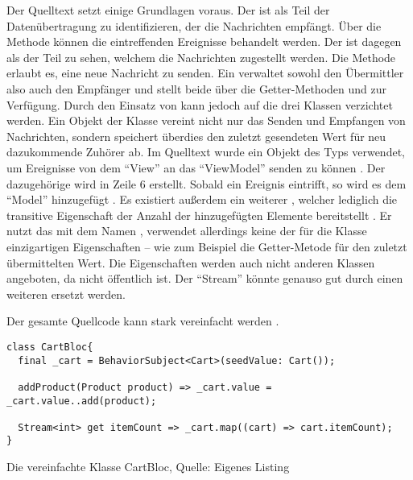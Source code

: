 Der Quelltext setzt einige Grundlagen voraus.
Der  ist als Teil der Datenübertragung zu identifizieren,
der die Nachrichten empfängt.
Über die Methode  können die eintreffenden Ereignisse behandelt werden.
Der  ist dagegen als der Teil zu sehen,
welchem die Nachrichten zugestellt werden.
Die Methode  erlaubt es,
eine neue Nachricht zu senden.
Ein  verwaltet sowohl den Übermittler also auch den Empfänger
und stellt beide über die Getter-Methoden  und  zur Verfügung.
Durch den Einsatz von  kann jedoch auf die drei Klassen verzichtet werden.
Ein Objekt der Klasse  vereint nicht nur das Senden und Empfangen von Nachrichten,
sondern speichert überdies den zuletzt gesendeten Wert für neu dazukommende Zuhörer ab.
Im Quelltext wurde ein Objekt des Typs  verwendet,
um Ereignisse von dem \enquote{View} an das \enquote{ViewModel} senden zu können .
Der dazugehörige  wird in Zeile 6 erstellt.
Sobald ein Ereignis eintrifft,
so wird es dem \enquote{Model}  hinzugefügt .
Es existiert außerdem ein weiterer  ,
 welcher lediglich die transitive Eigenschaft der Anzahl der hinzugefügten Elemente bereitstellt .
Er nutzt das  mit dem Namen  ,
verwendet allerdings keine der für die Klasse einzigartigen Eigenschaften
-- wie zum Beispiel die Getter-Metode  für den zuletzt übermittelten Wert.
Die Eigenschaften werden auch nicht anderen Klassen angeboten, da  nicht öffentlich ist.
Der \enquote{Stream}  könnte genauso gut durch einen weiteren  ersetzt werden.

Der gesamte Quellcode kann stark vereinfacht werden \Lst{\ref{lst:CartBlocVereinfacht}}.
\ifIncludeFigures
  \begin{listing}[h]
    \begin{verbatim}
class CartBloc{
  final _cart = BehaviorSubject<Cart>(seedValue: Cart());

  addProduct(Product product) => _cart.value = _cart.value..add(product);

  Stream<int> get itemCount => _cart.map((cart) => cart.itemCount);
}
\end{verbatim}
    \caption[Die vereinfachte Klasse CartBloc]{Die vereinfachte Klasse CartBloc, Quelle: Eigenes Listing}
    \label{lst:CartBlocVereinfacht}
  \end{listing}
\fi

